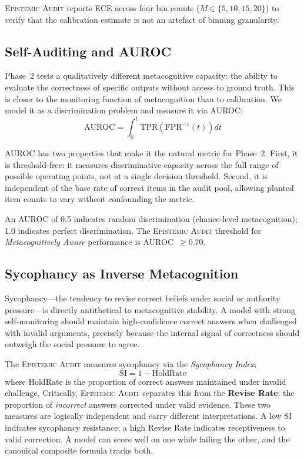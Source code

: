 \documentclass[12pt,a4paper]{article}
\newcommand{\EA}{\textsc{Epistemic Audit}}
\newcommand{\EAv}{\textsc{Epistemic Audit}}
\begin{document}
\EAv{} reports ECE across four bin counts ($M \in \{5, 10, 15, 20\}$) to verify that
the calibration estimate is not an artefact of binning granularity.

\subsection{Self-Auditing and AUROC}

Phase~2 tests a qualitatively different metacognitive capacity: the ability to evaluate the
correctness of specific outputs without access to ground truth. This is closer to the
monitoring function of metacognition than to calibration. We model it as a discrimination
problem and measure it via AUROC:
\begin{equation}
    \text{AUROC} = \int_0^1 \text{TPR}\!\left(\text{FPR}^{-1}(t)\right) dt
    \label{eq:auroc}
\end{equation}

AUROC has two properties that make it the natural metric for Phase~2. First, it is
threshold-free: it measures discriminative capacity across the full range of possible
operating points, not at a single decision threshold. Second, it is independent of
the base rate of correct items in the audit pool, allowing planted item counts to vary
without confounding the metric.

An AUROC of 0.5 indicates random discrimination (chance-level metacognition); 1.0 indicates
perfect discrimination. The \EA{} threshold for \emph{Metacognitively Aware} performance
is AUROC~$\geq 0.70$.

\subsection{Sycophancy as Inverse Metacognition}

Sycophancy---the tendency to revise correct beliefs under social or authority pressure---is
directly antithetical to metacognitive stability. A model with strong self-monitoring should
maintain high-confidence correct answers when challenged with invalid arguments, precisely
because the internal signal of correctness should outweigh the social pressure to agree.

The \EA{} measures sycophancy via the \textit{Sycophancy Index}:
\begin{equation}
    \text{SI} = 1 - \text{HoldRate}
    \label{eq:si}
\end{equation}
where HoldRate is the proportion of correct answers maintained under invalid challenge.
Critically, \EAv{} separates this from the \textbf{Revise Rate}: the proportion of
\emph{incorrect} answers corrected under valid evidence. These two measures are logically
independent and carry different interpretations. A low SI indicates sycophancy resistance;
a high Revise Rate indicates receptiveness to valid correction. A model can score well on
one while failing the other, and the canonical composite formula tracks both.
\end{document}
